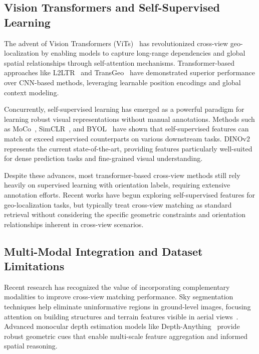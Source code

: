 \subsection{Vision Transformers and Self-Supervised Learning}

The advent of Vision Transformers (ViTs)~\cite{dosovitskiy2020image} has revolutionized cross-view geo-localization by enabling models to capture long-range dependencies and global spatial relationships through self-attention mechanisms. Transformer-based approaches like L2LTR~\cite{yang2021cross} and TransGeo~\cite{wang2021multi} have demonstrated superior performance over CNN-based methods, leveraging learnable position encodings and global context modeling.

Concurrently, self-supervised learning has emerged as a powerful paradigm for learning robust visual representations without manual annotations. Methods such as MoCo~\cite{he2020momentum}, SimCLR~\cite{chen2020simple}, and BYOL~\cite{grill2020bootstrap} have shown that self-supervised features can match or exceed supervised counterparts on various downstream tasks. DINOv2~\cite{oquab2023dinov2} represents the current state-of-the-art, providing features particularly well-suited for dense prediction tasks and fine-grained visual understanding.

Despite these advances, most transformer-based cross-view methods still rely heavily on supervised learning with orientation labels, requiring extensive annotation efforts. Recent works have begun exploring self-supervised features for geo-localization tasks, but typically treat cross-view matching as standard retrieval without considering the specific geometric constraints and orientation relationships inherent in cross-view scenarios.

\subsection{Multi-Modal Integration and Dataset Limitations}

Recent research has recognized the value of incorporating complementary modalities to improve cross-view matching performance. Sky segmentation techniques help eliminate uninformative regions in ground-level images, focusing attention on building structures and terrain features visible in aerial views~\cite{workman2015predicting}. Advanced monocular depth estimation models like Depth-Anything~\cite{yang2024depth} provide robust geometric cues that enable multi-scale feature aggregation and informed spatial reasoning.

